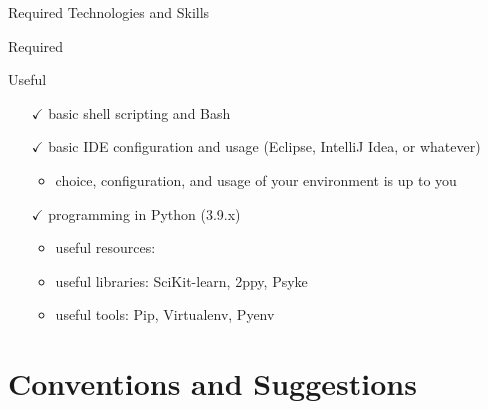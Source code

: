 \documentclass[presentation]{beamer}\mode<presentation>{\usetheme{AMSBolognaFC}}
\begin{document}
\begin{frame}[c,allowframebreaks]{Required Technologies and Skills}
\begin{alertblock}{Required}
\begin{itemize}
	\end{itemize}
\end{alertblock}

\begin{exampleblock}{Useful}
	\begin{itemize}
		\item[$\checkmark$] basic shell scripting and \alert{Bash}
		\item[$\checkmark$] basic IDE configuration and usage (\alert{Eclipse}, \alert{IntelliJ Idea}, or whatever)
		\begin{itemize}
			\item choice, configuration, and usage of your environment is up to you
		\end{itemize} 
		\item[$\checkmark$] programming in Python (3.9.x)
		\begin{itemize}
			\item useful resources: \ccite{}
			\item useful libraries: SciKit-learn, 2ppy, Psyke
			\item useful tools: Pip, Virtualenv, Pyenv
		\end{itemize}
	\end{itemize}
\end{exampleblock}

\end{frame}

\section{Conventions and Suggestions}
\end{document}
